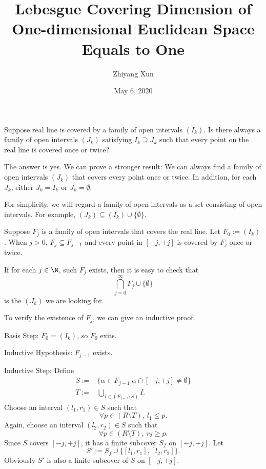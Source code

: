 
\title{Lebesgue Covering Dimension of One-dimensional Euclidean Space Equals to One}
\author{Zhiyang Xun}
\date{May 6, 2020}

    \maketitle
    \begin{tcolorbox}
        \begin{problem}
            Suppose real line is covered by a family of open intervals $(I_k)$. Is there always a family of open intervals $(J_k)$ satisfying $I_k\supseteq J_k$ such that every point on the real line is covered once or twice?
        \end{problem}
    \end{tcolorbox}

    The answer is yes. We can prove a stronger result: We can always find a family of open intervals $(J_k)$ that covers every point once or twice. In addition, for each $J_k$, either $J_k = I_k$ or $J_k = \emptyset$. 
    
    For simplicity, we will regard a family of open intervals as a set consisting of open intervals. For example, $(J_k) \subseteq (I_k) \cup \{\emptyset\}$.

    Suppose $F_j$ is a family of open intervals that covers the real line. Let $F_0 := (I_k)$. When $j > 0$, $F_j \subseteq F_{j-1}$ and every point in $[-j, +j]$ is covered by $F_j$ once or twice.

    If for each $j \in \N$, such $F_j$ exists, then it is easy to check that \[
        \bigcap_{j = 0}^{\infty} F_j \cup \{\emptyset\}
    \]
    is the $(J_k)$ we are looking for.

    To verify the existence of $F_j$, we can give an inductive proof. 

    {Basis Step:} $F_0 = (I_k)$, so $F_0$ exits.

    {Inductive Hypothesis:} $F_{j-1}$ exists.

    {Inductive Step:} Define 
        \begin{align*}
            S := &\{\alpha \in F_{j-1} | \alpha \cap [-j, +j] \neq \emptyset\} \\
            T := &\bigcup_{I \in (F_{j-1} \setminus S)} I.
        \end{align*}
     Choose an interval $(l_1, r_1) \in S$ such that \[   \forall p \in (R \setminus T),\ l_1 \leq p.
    \] 
    Again, choose an interval $(l_2, r_2) \in S$ such that \[
        \forall p \in (R \setminus T),\ r_2 \geq p.
    \]
    Since $S$ covers $[-j, +j]$, it has a finite subcover $S_f$ on $[-j, +j]$. Let \[
        S' := S_f \cup \{[l_1, r_1] , [l_2, r_2]\}.
    \]
    Obviously $S'$ is also a finite subcover of $S$ on $[-j, +j]$.

